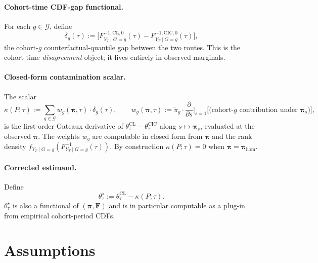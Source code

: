 \documentclass[11pt]{article}
\theoremstyle{definition}
\theoremstyle{plain}
\theoremstyle{remark}
\begin{document}
\paragraph{Cohort-time CDF-gap functional.} For each $g \in \mathcal{G}$, define
\[ \delta_g(\tau) := \big[ F^{-1, \mathrm{CL}, 0}_{Y_T \mid G=g}(\tau) - F^{-1, \mathrm{CIC}, 0}_{Y_T \mid G=g}(\tau) \big], \]
the cohort-$g$ counterfactual-quantile gap between the two routes. This is the cohort-time \emph{disagreement} object; it lives entirely in observed marginals.

\paragraph{Closed-form contamination scalar.} The scalar
\[ \kappa(P; \tau) := \sum_{g \in \mathcal{G}} w_g(\boldsymbol\pi, \tau) \cdot \delta_g(\tau), \qquad w_g(\boldsymbol\pi, \tau) := \tilde\pi_g \cdot \frac{\partial}{\partial s}\!\bigg|_{s=1} \big[ \text{(cohort-$g$ contribution under }\boldsymbol\pi_s\text{)} \big], \]
is the first-order Gateaux derivative of $\theta^{\mathrm{CL}}_\tau - \theta^{\mathrm{CIC}}_\tau$ along $s \mapsto \boldsymbol\pi_s$, evaluated at the observed $\boldsymbol\pi$. The weights $w_g$ are computable in closed form from $\boldsymbol\pi$ and the rank density $f_{Y_T \mid G=g}(F^{-1}_{Y_T \mid G=g}(\tau))$. By construction $\kappa(P; \tau) = 0$ when $\boldsymbol\pi = \boldsymbol\pi_{\mathrm{hom}}$.

\paragraph{Corrected estimand.} Define
\[ \theta^\star_\tau := \theta^{\mathrm{CL}}_\tau - \kappa(P; \tau). \]
$\theta^\star_\tau$ is also a functional of $(\boldsymbol\pi, \mathbf{F})$ and is in particular computable as a plug-in from empirical cohort-period CDFs.

\section{Assumptions}
\end{document}
